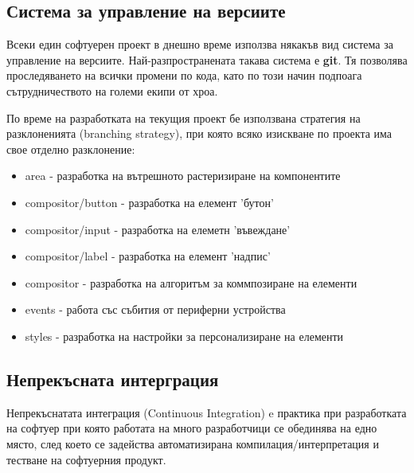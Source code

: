         \subsection{Система за управление на версиите}

                Всеки един софтуерен проект в днешно време използва някакъв вид
                система за управление на версиите. Най-разпространената такава
                система е \textbf{git}. Тя позволява проследяването на всички 
                промени по кода, като по този начин подпоага сътрудничеството 
                на големи екипи от хроа.

                По време на разработката на текущия проект бе използвана
                стратегия на разклоненията (branching strategy), при която 
                всяко изискване по проекта има свое отделно разклонение:

                \begin{itemize}
                        \item area - разработка на вътрешното растеризиране 
                                на компонентите
                        \item compositor/button - разработка на елемент 
                                'бутон'
                        \item compositor/input - разработка на елеметн 
                                'въвеждане'
                        \item compositor/label - разработка на елемент 
                                'надпис'
                        \item compositor - разработка на алгоритъм за
                                коммпозиране на елементи
                        \item events - работа със събития от периферни 
                                устройства
                        \item styles - разработка на настройки за 
                                персонализиране на елементи
                \end{itemize}

        \subsection{Непрекъсната интерграция}

                Непрекъснатата интеграция (Continuous Integration) 
                 e практика при разработката на софтуер при 
                която работата на много разработчици се обединява на едно 
                място, след което се задейства автоматизирана 
                компилация/интерпретация и тестване на софтуерния продукт.

